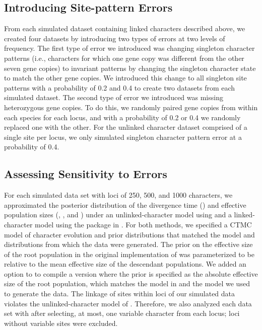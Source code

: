 \subsection{Introducing Site-pattern Errors}
From each simulated dataset containing linked characters described above, we 
created four datasets by 
introducing two types of errors at two levels of frequency. The first type of 
error we introduced was changing singleton character patterns (i.e., characters 
for which one gene copy was different from the other seven gene copies) to invariant 
patterns by changing the singleton character state to match the other gene 
copies. We introduced this change to all singleton site patterns with a probability of 0.2 and 0.4 to create 
two datasets from each simulated dataset. The second type of error we introduced 
was missing heterozygous gene copies. To do this, we randomly paired gene copies 
from within each species for each locus, and with a probability 
of 0.2 or 0.4 we randomly replaced one with the other. For the unlinked character 
dataset comprised of a single site per locus, we only simulated singleton 
character pattern error at a probability of 0.4.

\subsection{Assessing Sensitivity to Errors}
For each simulated data set with loci of 250, 500, and 1000 characters, we
approximated the posterior distribution of the 
divergence time (\divtime) and effective population sizes (\rootpopsize, \tippopsize[1], and \tippopsize[2])
under an unlinked-character model using \ecoevolity
\citep[Version 0.3.2, Commit a7e9bf2;][]{Oaks2018ecoevolity}
and a linked-character model using the \beast package
\citep[Version 0.15.1;][]{ogilvieStarBEAST2BringsFaster2017} in \beastcore
\citep[Version 2.5.2;][]{bouckaertBEASTSoftwarePlatform2014}.
For both methods, we specified a CTMC model of character evolution and prior
distributions that matched the model and distributions from which the data were
generated. The prior on the effective size of the root population in the original
implementation of \ecoevolity was parameterized to be relative to the mean
effective size of the descendant populations.
We added an option to \ecoevolity to compile a version where the prior is
specified as the absolute effective size of the root population,
which matches the model in \beast and the model we used to generate the data.
The linkage of sites within loci of our simulated data violates the 
unlinked-character model of \ecoevolity \citep{bryantInferringSpeciesTrees2012,Oaks2018ecoevolity}. Therefore, we also analyzed each data 
set with \ecoevolity after selecting, at most, one variable character from 
each locus; loci without variable sites were excluded. 

